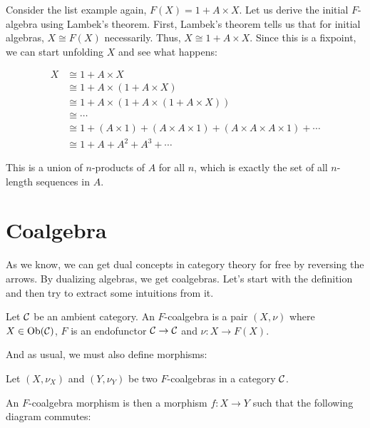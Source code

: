 
\begin{example}
  Consider the list example again, $F(X) = 1 + A \times X$.
Let us derive the initial $F$-algebra using Lambek's theorem.
First, Lambek's theorem tells us that for initial algebras, $X \cong F(X)$ necessarily.
Thus, $X \cong 1 + A \times X$.
Since this is a fixpoint, we can start unfolding $X$ and see what happens:

\begin{align*}
    X &\cong 1 + A \times X \\
    &\cong 1 + A \times (1 + A \times X) \\
    &\cong 1 + A \times (1 + A \times (1 + A \times X)) \\
    &\cong \cdots \\
    &\cong 1 + (A \times 1) + (A \times A \times 1) + (A \times A \times A \times 1) + \cdots \\
    &\cong 1 + A + A^2 + A^3 + \cdots
\end{align*}

This is a union of $n$-products of $A$ for all $n$, which is exactly the set of all $n$-length sequences in $A$.
    
\end{example}
    

\section{Coalgebra}

As we know, we can get dual concepts in category theory for free by reversing the arrows.
By dualizing algebras, we get coalgebras.
Let's start with the definition and then try to extract some intuitions from it.

\begin{definition}[$F$-coalgebra]
  Let $\mathcal C$ be an ambient category. An $F$-coalgebra is a pair $(X, \nu)$ where $X \in \operatorname{Ob}(\mathcal C)$, $F$ is an endofunctor $\mathcal C \rightarrow \mathcal C$ and $\nu : X \rightarrow F(X)$.
\end{definition}

And as usual, we must also define morphisms:

\begin{definition}
    \label{def:fCoalgebraMorphism}
  Let $(X, \nu_X)$ and $(Y, \nu_Y)$ be two $F$-coalgebras in a category $\mathcal C$.

  An $F$-coalgebra morphism is then a morphism $f : X \rightarrow Y$ such that the following diagram commutes:

\end{definition}

